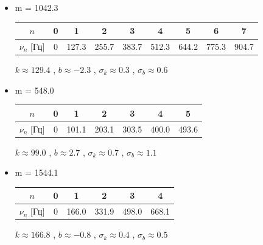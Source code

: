 \documentclass[8pt]{article}
\begin{document}
    \begin{itemize}
        \item m = 1042.3
                    \begin{center}
                    \begin{tabular}{|c|c|c|c|c|c|c|c|c|}
                            \hline 
                                $n$ & 0 & 1 & 2 & 3 & 4 & 5 & 6 & 7 \\
                            \hline
                                $\nu_n$ [Гц] &0&127.3&255.7&383.7&512.3&644.2&775.3&904.7\\
                            \hline
                    \end{tabular}
                    \end{center}

        \indent $k \approx 129.4$  , $b \approx -2.3$ , $\sigma_k \approx 0.3$ , $\sigma_b \approx 0.6$ \\

        \item m = 548.0
                    \begin{center}
                    \begin{tabular}{|c|c|c|c|c|c|c|}
                            \hline 
                                $n$ & 0 & 1 & 2 & 3 & 4 & 5 \\
                            \hline
                                $\nu_n$ [Гц] &0&101.1&203.1&303.5&400.0&493.6\\
                            \hline
                    \end{tabular}
                    \end{center}
            $k \approx 99.0$  , $b \approx 2.7$ , $\sigma_k \approx 0.7$ , $\sigma_b \approx 1.1$ \\
        \item m = 1544.1
                    \begin{center}
                    \begin{tabular}{|c|c|c|c|c|c|}
                            \hline 
                                $n$ & 0 & 1 & 2 & 3 & 4  \\
                            \hline
                                $\nu_n$ [Гц] &0&166.0&331.9&498.0&668.1\\
                            \hline
                    \end{tabular}
                    \end{center}
            $k \approx 166.8$  , $b \approx -0.8$ , $\sigma_k \approx 0.4$ , $\sigma_b \approx 0.5$ \\


\end{itemize}
\end{document}
